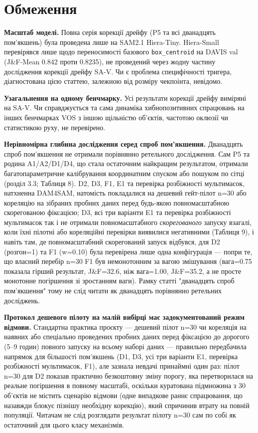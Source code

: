 \documentclass[11pt]{article}
\begin{document}
\section{Обмеження}

\textbf{Масштаб моделі.} Повна серія корекції дрейфу (P5 та всі дванадцять пом'якшень) була проведена лише на SAM2.1 Hiera-Tiny. Hiera-Small перевірявся лише щодо переносимості базового \texttt{box\_centroid} на DAVIS val (J\&F-Mean 0.842 проти 0.8235), не проведений через жодну частину дослідження корекції дрейфу SA-V. Чи є проблема специфічності тригера, діагностована цією статтею, залежною від розміру чекпоінта, невідомо.

\textbf{Узагальнення на одному бенчмарку.} Усі результати корекції дрейфу виміряні на SA-V. Чи справджується та сама динаміка хибнопозитивних спрацювань на інших бенчмарках VOS з іншою щільністю об'єктів, частотою оклюзії чи статистикою руху, не перевірено.

\textbf{Нерівномірна глибина дослідження серед спроб пом'якшення.} Дванадцять спроб пом'якшення не отримали порівнянно ретельного дослідження. Сам P5 та родина A1/A2/D1/D4, що стала остаточним найкращим результатом, отримали багатопараметричне калібрування координатним спуском або пошуком по сітці (розділ 3.3; Таблиця 8). D2, D3, F1, E1 та перевірка розбіжності мультимасок, натхненна DAM4SAM, натомість покладалися на дешевий гейт-пілот n=30 або кореляцію на зібраних пробних даних перед будь-якою повномасштабною скорегованою фіксацією; D3, всі три варіанти E1 та перевірка розбіжності мультимасок так і не отримали повномасштабного \emph{скорегованого} запуску взагалі, коли їхні пілотні або кореляційні перевірки виявилися негативними (Таблиця 9), і навіть там, де повномасштабний скорегований запуск відбувся, для D2 (розгон=1) та F1 (w=0.10) була перевірена лише одна конфігурація --- попри те, що власний перебір n=30 F1 був немонотонним за вагою змішування (вага=0.75 показала гірший результат, J\&F=32.6, ніж вага=1.00, J\&F=35.2, а не просте монотонне погіршення зі зростанням ваги). Рамку статті "дванадцять спроб пом'якшення" тому не слід читати як дванадцять порівнянно ретельних досліджень.

\textbf{Протокол дешевого пілоту на малій вибірці має задокументований режим відмови.} Стандартна практика проєкту --- дешевий пілот n=30 чи кореляція на наявних або спеціально проведених пробних даних перед фіксацією до дорогого (5--9 годин) повного запуску на всьому наборі даних --- правильно передбачила напрямок для більшості пом'якшень (D1, D3, усі три варіанти E1, перевірка розбіжності мультимасок, F1), але зазнала невдачі принаймні один раз: пілот n=30 для D2 показав практично безкоштовну зміну порогу, яка перетворилася на реальне погіршення в повному масштабі, оскільки куратована підмножина з 30 об'єктів не містить сценарію відмови (одне випадкове раннє спрацювання, що назавжди блокує пізнішу необхідну корекцію), який спричинив втрату на повній популяції. Читачам не слід розглядати результат пілоту n=30 сам по собі як остаточний для цього класу механізмів.
\end{document}
